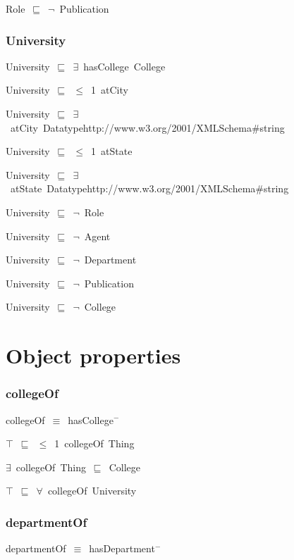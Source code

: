 \documentclass{article}
\begin{document}
Role~\ensuremath{\sqsubseteq}~\ensuremath{\lnot}~Publication

\subsubsection*{University}

University~\ensuremath{\sqsubseteq}~\ensuremath{\exists}~hasCollege~College~

University~\ensuremath{\sqsubseteq}~\ensuremath{\leq}~1~atCity~

University~\ensuremath{\sqsubseteq}~\ensuremath{\exists}~atCity~Datatypehttp://www.w3.org/2001/XMLSchema#string~

University~\ensuremath{\sqsubseteq}~\ensuremath{\leq}~1~atState~

University~\ensuremath{\sqsubseteq}~\ensuremath{\exists}~atState~Datatypehttp://www.w3.org/2001/XMLSchema#string~

University~\ensuremath{\sqsubseteq}~\ensuremath{\lnot}~Role

University~\ensuremath{\sqsubseteq}~\ensuremath{\lnot}~Agent

University~\ensuremath{\sqsubseteq}~\ensuremath{\lnot}~Department

University~\ensuremath{\sqsubseteq}~\ensuremath{\lnot}~Publication

University~\ensuremath{\sqsubseteq}~\ensuremath{\lnot}~College

\section*{Object properties}\subsubsection*{collegeOf}

collegeOf~\ensuremath{\equiv}~hasCollege\ensuremath{^-}

\ensuremath{\top}~\ensuremath{\sqsubseteq}~\ensuremath{\leq}~1~collegeOf~Thing

\ensuremath{\exists}~collegeOf~Thing~\ensuremath{\sqsubseteq}~College

\ensuremath{\top}~\ensuremath{\sqsubseteq}~\ensuremath{\forall}~collegeOf~University

\subsubsection*{departmentOf}

departmentOf~\ensuremath{\equiv}~hasDepartment\ensuremath{^-}
\end{document}
